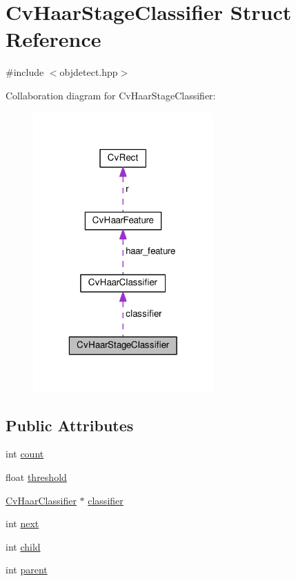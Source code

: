 \hypertarget{structCvHaarStageClassifier}{\section{Cv\-Haar\-Stage\-Classifier Struct Reference}
\label{structCvHaarStageClassifier}
}


{\ttfamily \#include $<$objdetect.\-hpp$>$}



Collaboration diagram for Cv\-Haar\-Stage\-Classifier\-:\nopagebreak
\begin{figure}[H]
\begin{center}
\leavevmode
\includegraphics[width=196pt]{structCvHaarStageClassifier__coll__graph}
\end{center}
\end{figure}
\subsection*{Public Attributes}
\begin{DoxyCompactItemize}
\item 
int \hyperlink{structCvHaarStageClassifier_aa2ab0af71780c68bf95b298011300cb7}{count}
\item 
float \hyperlink{structCvHaarStageClassifier_ae0403def5cc2c27348b0353bbfab3da6}{threshold}
\item 
\hyperlink{structCvHaarClassifier}{Cv\-Haar\-Classifier} $\ast$ \hyperlink{structCvHaarStageClassifier_a51af605e7e7c54c854abfd479b7bd3c6}{classifier}
\item 
int \hyperlink{structCvHaarStageClassifier_a7e97b1340023ff302510413314317edf}{next}
\item 
int \hyperlink{structCvHaarStageClassifier_a0ba4274d0eea94c4e2c9e856a587f66d}{child}
\item 
int \hyperlink{structCvHaarStageClassifier_aec7d53a6aff0f86a244d85c266cbb98d}{parent}
\end{DoxyCompactItemize}


